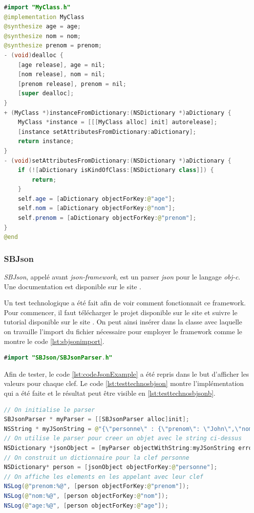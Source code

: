 \begin{lstlisting}[language={JAVA}, caption={Objectify - Resultat du fichier.m}, label={lst:objectifyb}]
#import "MyClass.h"
@implementation MyClass
@synthesize age = age;
@synthesize nom = nom;
@synthesize prenom = prenom;
- (void)dealloc {
    [age release], age = nil;
    [nom release], nom = nil;
    [prenom release], prenom = nil;
    [super dealloc];
}
+ (MyClass *)instanceFromDictionary:(NSDictionary *)aDictionary {
    MyClass *instance = [[[MyClass alloc] init] autorelease];
    [instance setAttributesFromDictionary:aDictionary];
    return instance;
}
- (void)setAttributesFromDictionary:(NSDictionary *)aDictionary {
    if (![aDictionary isKindOfClass:[NSDictionary class]]) {
        return;
    }
    self.age = [aDictionary objectForKey:@"age"];
    self.nom = [aDictionary objectForKey:@"nom"];
    self.prenom = [aDictionary objectForKey:@"prenom"];
}
@end
\end{lstlisting}
\subsubsection{SBJson}
\emph{SBJson}, appelé avant \emph{json-framework}, est un parser \emph{\gls{json}} pour le langage \emph{\gls{obj-c}}. Une documentation est disponible sur le site \cite{online:sbjson}.

\medskip

Un test technologique a été fait afin de voir comment fonctionnait ce framework. Pour commencer, il faut télécharger le projet disponible sur le site \cite{online:sbjson} et suivre le tutorial disponible sur le site \cite{online:sbjsonproject}. On peut ainsi insérer dans la classe avec laquelle on travaille l'import du fichier nécessaire pour employer le framework comme le montre le code \ref{lst:sbjsonimport}.

\begin{lstlisting}[language={JAVA}, caption={Import de l'interface SBJson}, label={lst:sbjsonimport}]
#import "SBJson/SBJsonParser.h"
\end{lstlisting}

Afin de tester, le code \ref{lst:codeJsonExample} a été repris dans le but d'afficher les valeurs pour chaque clef. Le code \ref{lst:testtechnosbjson} montre l'implémentation qui a été faite et le résultat peut être visible en \ref{lst:testtechnosbjsonb}.

\begin{lstlisting}[language={JAVA}, caption={Test technologique pour SBJson}, label={lst:testtechnosbjson}]
// On initialise le parser
SBJsonParser * myParser = [[SBJsonParser alloc]init];
NSString * myJSonString = @"{\"personne\" : {\"prenom\": \"John\",\"nom\": \"Doe\",\"age\": \"42\"}}";
// On utilise le parser pour creer un objet avec le string ci-dessus
NSDictionary *jsonObject = [myParser objectWithString:myJSonString error:NULL];
// On construit un dictionnaire pour la clef personne
NSDictionary* person = [jsonObject objectForKey:@"personne"];
// On affiche les elements en les appelant avec leur clef
NSLog(@"prenom:%@", [person objectForKey:@"prenom"]);
NSLog(@"nom:%@", [person objectForKey:@"nom"]);
NSLog(@"age:%@", [person objectForKey:@"age"]);
\end{lstlisting}

